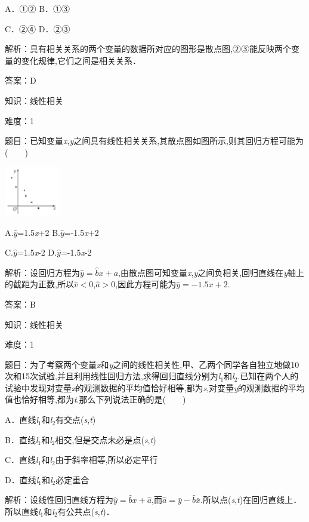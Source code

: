 \documentclass{article} %
\begin{document}
A．①② B．①③

C．②④  D．②③

解析：具有相关关系的两个变量的数据所对应的图形是散点图,②③能反映两个变量的变化规律,它们之间是相关关系．

答案：D

知识：线性相关

难度：1

题目：已知变量\textit{x},\textit{y}之间具有线性相关关系,其散点图如图所示,则其回归方程可能为(　　)

\includegraphics*[width=0.98in, height=0.85in, keepaspectratio=false]{image97}

A.$\hat{y}$=1.5\textit{x}+2  B.$\hat{y}$=-1.5\textit{x}+2

C.$\hat{y}$=1.5\textit{x}-2  D.$\hat{y}$=-1.5\textit{x}-2

解析：设回归方程为$\hat{y}=\hat{b}x+a$,由散点图可知变量\textit{x},\textit{y}之间负相关,回归直线在\textit{y}轴上的截距为正数,所以$\hat{v}\mathrm{<}$0,$\hat{a}\mathrm{>}$0,因此方程可能为$\hat{y}=-1.5x+2$.

答案：B

知识：线性相关

难度：1

题目：为了考察两个变量\textit{x}和\textit{y}之间的线性相关性,甲、乙两个同学各自独立地做10次和15次试验,并且利用线性回归方法,求得回归直线分别为\textit{l}${}_{1}$和\textit{l}${}_{2}$.已知在两个人的试验中发现对变量\textit{x}的观测数据的平均值恰好相等,都为\textit{s},对变量\textit{y}的观测数据的平均值也恰好相等,都为\textit{t}.那么下列说法正确的是(　　)

A．直线\textit{l}${}_{1}$和\textit{l}${}_{2}$有交点(\textit{s},\textit{t})

B．直线\textit{l}${}_{1}$和\textit{l}${}_{2}$相交,但是交点未必是点(\textit{s},\textit{t})

C．直线\textit{l}${}_{1}$和\textit{l}${}_{2}$由于斜率相等,所以必定平行

D．直线\textit{l}${}_{1}$和\textit{l}${}_{2}$必定重合

解析：设线性回归直线方程为$\hat{y}=\hat{b}x+\hat{a}$,而$\hat{a}=\bar{y}-\hat{b}\bar{x}$.所以点(\textit{s},\textit{t})在回归直线上．所以直线\textit{l}${}_{1}$和\textit{l}${}_{2}$有公共点(\textit{s},\textit{t})．
\end{document}
